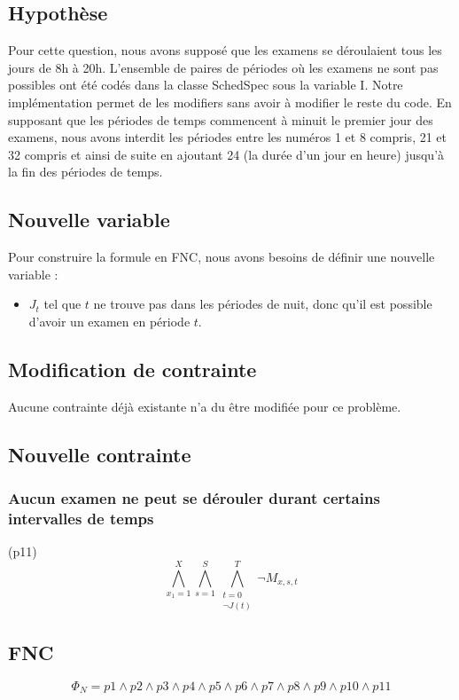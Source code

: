 \documentclass[a4paper,11pt]{article}
\begin{document}
\subsection{Hypothèse}
Pour cette question, nous avons supposé que les examens se déroulaient tous les jours de 8h à 20h. L'ensemble de paires de périodes où les examens ne sont pas possibles ont été codés dans la classe SchedSpec sous la variable I. Notre implémentation permet de les modifiers sans avoir à modifier le reste du code.
En supposant que les périodes de temps commencent à minuit le premier jour des examens, nous avons interdit les périodes entre les numéros 1 et 8 compris, 21 et 32 compris et ainsi de suite en ajoutant 24 (la durée d'un jour en heure) jusqu'à la fin des périodes de temps.

\subsection{Nouvelle variable}

Pour construire la formule en FNC, nous avons besoins de définir une nouvelle variable :  
\begin{itemize}
	\item \( J_{t}\) tel que $t$  ne trouve pas dans les périodes de nuit, donc qu'il est possible d'avoir un examen en période $t$.
\end{itemize}

\subsection{Modification de contrainte}
Aucune contrainte déjà existante n'a du être modifiée pour ce problème.

\subsection{Nouvelle contrainte}

\subsubsection{Aucun examen ne peut se dérouler durant certains intervalles de temps}
(p11)
\begin{displaymath}
\bigwedge\limits_{x_{1}=1}^{X}\bigwedge\limits_{s=1}^{S}\bigwedge\limits_{\substack{t=0 \\ \neg J(t) }}^{T} \neg M_{x, s, t}
\end{displaymath}

\subsection{FNC}
\begin{displaymath}
	\Phi_{N} = p1 \wedge p2 \wedge p3 \wedge p4 \wedge p5 \wedge p6 \wedge p7 \wedge p8 \wedge p9 \wedge p10 \wedge p11
\end{displaymath}
\end{document}
